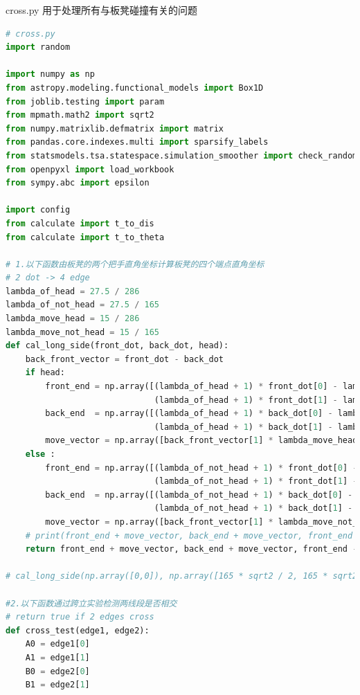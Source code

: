 \documentclass[a4paper]{article}
\begin{document}
 cross.py 用于处理所有与板凳碰撞有关的问题
	\begin{lstlisting}[language=python,columns=fullflexible,frame=shadowbox]
# cross.py
import random

import numpy as np
from astropy.modeling.functional_models import Box1D
from joblib.testing import param
from mpmath.math2 import sqrt2
from numpy.matrixlib.defmatrix import matrix
from pandas.core.indexes.multi import sparsify_labels
from statsmodels.tsa.statespace.simulation_smoother import check_random_state
from openpyxl import load_workbook
from sympy.abc import epsilon

import config
from calculate import t_to_dis
from calculate import t_to_theta

# 1.以下函数由板凳的两个把手直角坐标计算板凳的四个端点直角坐标
# 2 dot -> 4 edge
lambda_of_head = 27.5 / 286
lambda_of_not_head = 27.5 / 165
lambda_move_head = 15 / 286
lambda_move_not_head = 15 / 165
def cal_long_side(front_dot, back_dot, head):
    back_front_vector = front_dot - back_dot
    if head:
        front_end = np.array([(lambda_of_head + 1) * front_dot[0] - lambda_of_head * back_dot[0],
                              (lambda_of_head + 1) * front_dot[1] - lambda_of_head * back_dot[1]])
        back_end  = np.array([(lambda_of_head + 1) * back_dot[0] - lambda_of_head * front_dot[0],
                              (lambda_of_head + 1) * back_dot[1] - lambda_of_head * front_dot[1]])
        move_vector = np.array([back_front_vector[1] * lambda_move_head, - back_front_vector[0] * lambda_move_head])
    else :
        front_end = np.array([(lambda_of_not_head + 1) * front_dot[0] - lambda_of_not_head * back_dot[0],
                              (lambda_of_not_head + 1) * front_dot[1] - lambda_of_not_head * back_dot[1]])
        back_end  = np.array([(lambda_of_not_head + 1) * back_dot[0] - lambda_of_not_head * front_dot[0],
                              (lambda_of_not_head + 1) * back_dot[1] - lambda_of_not_head * front_dot[1]])
        move_vector = np.array([back_front_vector[1] * lambda_move_not_head, - back_front_vector[0] * lambda_move_not_head])
    # print(front_end + move_vector, back_end + move_vector, front_end - move_vector, back_end - move_vector)
    return front_end + move_vector, back_end + move_vector, front_end - move_vector, back_end - move_vector

# cal_long_side(np.array([0,0]), np.array([165 * sqrt2 / 2, 165 * sqrt2 / 2]), False)

#2.以下函数通过跨立实验检测两线段是否相交
# return true if 2 edges cross
def cross_test(edge1, edge2):
    A0 = edge1[0]
    A1 = edge1[1]
    B0 = edge2[0]
    B1 = edge2[1]


\end{lstlisting}
\end{document}
